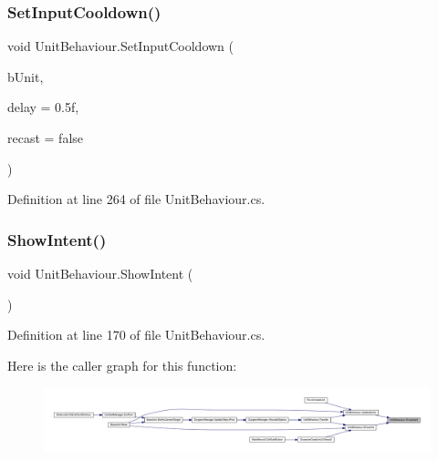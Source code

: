 \subsubsection{\texorpdfstring{SetInputCooldown()}{SetInputCooldown()}}
{\footnotesize\ttfamily void Unit\+Behaviour.\+Set\+Input\+Cooldown (\begin{DoxyParamCaption}\item[{\mbox{\hyperlink{class_base_unit}{Base\+Unit}}}]{b\+Unit,  }\item[{float}]{delay = {\ttfamily 0.5f},  }\item[{bool}]{recast = {\ttfamily false} }\end{DoxyParamCaption})}



Definition at line 264 of file Unit\+Behaviour.\+cs.

\mbox{\label{class_unit_behaviour_a0cf70610b8aef46ef592819496ac7950}} 
\subsubsection{\texorpdfstring{ShowIntent()}{ShowIntent()}}
{\footnotesize\ttfamily void Unit\+Behaviour.\+Show\+Intent (\begin{DoxyParamCaption}{ }\end{DoxyParamCaption})}



Definition at line 170 of file Unit\+Behaviour.\+cs.

Here is the caller graph for this function\+:
\nopagebreak
\begin{figure}[H]
\begin{center}
\leavevmode
\includegraphics[width=350pt]{class_unit_behaviour_a0cf70610b8aef46ef592819496ac7950_icgraph}
\end{center}
\end{figure}
\mbox{\label{class_unit_behaviour_a41b8d7f5a98e21449eafe21a31707b1d}} 
